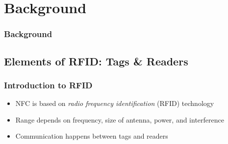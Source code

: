 \documentclass[unknownkeysallowed]{beamer}
\begin{document}
\section{Background}
\begin{frame}
  \frametitle{Background}
    \begin{center}\begin{minipage}{.9\textwidth}
    \tableofcontents[currentsubsection, hideothersubsections, sectionstyle=show/shaded]
    \end{minipage}\end{center}
\end{frame}
%


\subsection{Elements of RFID: Tags \& Readers}
\begin{frame}
  \frametitle{Introduction to RFID}
    \begin{center}\begin{minipage}{.9\textwidth}
      \vspace{2mm}
      \begin{center}
      \end{center}
      \vspace{2mm}
      \begin{itemize}
        \item{NFC is based on \textit{radio frequency identification} (RFID) technology}
        \vspace{3mm}
        \pause
        \item{Range depends on frequency, size of antenna, power, and interference}
        \vspace{3mm}
        \pause
        \item{Communication happens between tags and readers}
      \end{itemize}
    \end{minipage}\end{center}
\end{frame}
\end{document}
